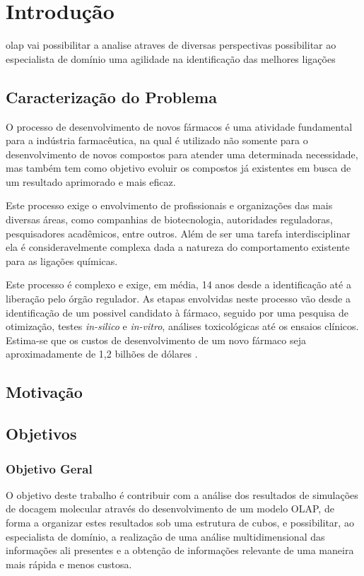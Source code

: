 \chapter{Introdução}

olap vai possibilitar a analise atraves de diversas perspectivas
possibilitar ao especialista de domínio uma agilidade na identificação das melhores ligações

\section{Caracterização do Problema}
O processo de desenvolvimento de novos fármacos é uma atividade fundamental para a indústria farmacêutica, na qual é utilizado não somente para o desenvolvimento de novos compostos para atender uma determinada necessidade, mas também tem como objetivo evoluir os compostos já existentes em busca de um resultado aprimorado e mais eficaz. 

Este processo exige o envolvimento de profissionais e organizações das mais diversas áreas, como companhias de biotecnologia, autoridades reguladoras, pesquisadores acadêmicos, entre outros. Além de ser uma tarefa interdisciplinar ela é consideravelmente complexa dada a natureza do comportamento existente para as ligações químicas.


Este processo é complexo e exige, em média, 14 anos desde a identificação até a liberação pelo órgão regulador. As etapas envolvidas neste processo vão desde a identificação de um possivel candidato à fármaco, seguido por uma pesquisa de otimização, testes \emph{in-silico} e \emph{in-vitro}, análises toxicológicas até os ensaios clínicos. Estima-se que os custos de desenvolvimento de um novo fármaco seja aproximadamente de 1,2 bilhões de dólares \cite{kun92}. 


\section{Motivação}

\section{Objetivos}
\subsection{Objetivo Geral}
O objetivo deste trabalho é contribuir com a análise dos resultados de simulações de docagem molecular através do desenvolvimento de um modelo OLAP, de forma a organizar estes resultados sob uma estrutura de cubos, e possibilitar, ao especialista de domínio, a realização de uma análise multidimensional das informações ali presentes e a obtenção de informações relevante de uma maneira mais rápida e menos custosa.

